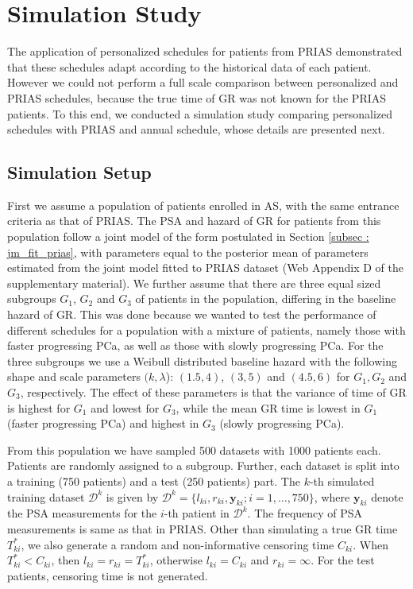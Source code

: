 \section{Simulation Study}
\label{sec: simulation_study}
The application of personalized schedules for patients from PRIAS demonstrated that these schedules adapt according to the historical data of each patient. However we could not perform a full scale comparison between personalized and PRIAS schedules, because the true time of GR was not known for the PRIAS patients. To this end, we conducted a simulation study comparing personalized schedules with PRIAS and annual schedule, whose details are presented next.

\subsection{Simulation Setup}
\label{subsec : simulation_setup}
First we assume a population of patients enrolled in AS, with the same entrance criteria as that of PRIAS. The PSA and hazard of GR for patients from this population follow a joint model of the form postulated in Section \ref{subsec : jm_fit_prias}, with parameters equal to the posterior mean of parameters estimated from the joint model fitted to PRIAS dataset (Web Appendix D of the supplementary material). We further assume that there are three equal sized subgroups $G_1$, $G_2$ and $G_3$ of patients in the population, differing in the baseline hazard of GR. This was done because we wanted to test the performance of different schedules for a population with a mixture of patients, namely those with faster progressing PCa, as well as those with slowly progressing PCa. For the three subgroups we use a Weibull distributed baseline hazard with the following shape and scale parameters $(k, \lambda$): $(1.5, 4)$, $(3, 5)$ and $(4.5, 6)$ for $G_1, G_2$ and $G_3$, respectively. The effect of these parameters is that the variance of time of GR is highest for $G_1$ and lowest for $G_3$, while the mean GR time is lowest in $G_1$ (faster progressing PCa) and highest in $G_3$ (slowly progressing PCa).

From this population we have sampled 500 datasets with 1000 patients each. Patients are randomly assigned to a subgroup. Further, each dataset is split into a training (750 patients) and a test (250 patients) part. The $k$-th simulated training dataset $\mathcal{D}^k$ is given by $\mathcal{D}^k = \{l_{ki}, r_{ki}, \boldsymbol{y}_{ki}; i = 1, \ldots, 750\}$, where $\boldsymbol{y}_{ki}$ denote the PSA measurements for the $i$-th patient in $\mathcal{D}^k$. The frequency of PSA measurements is same as that in PRIAS. Other than simulating a true GR time $T^*_{ki}$, we also generate a random and non-informative censoring time $C_{ki}$. When $T^*_{ki} < C_{ki}$, then $l_{ki} = r_{ki} = T^*_{ki}$, otherwise $l_{ki} = C_{ki}$ and $r_{ki} = \infty$. For the test patients, censoring time is not generated.

